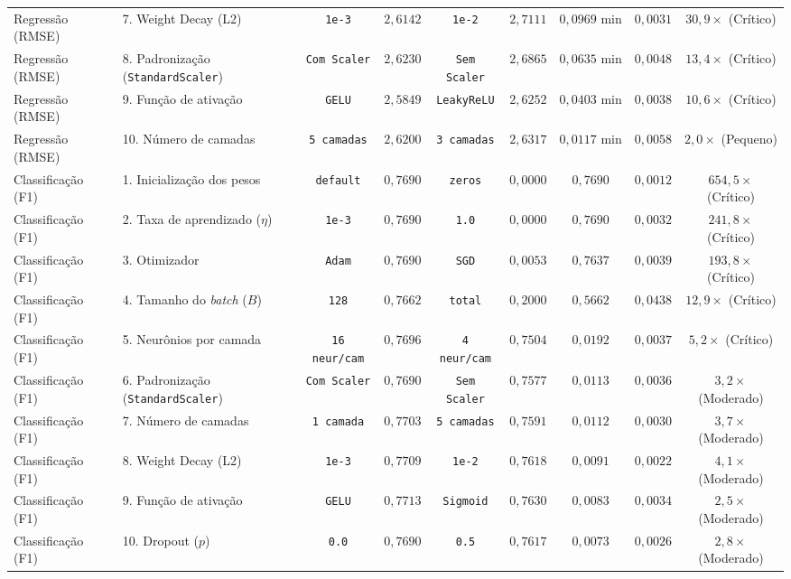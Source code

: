 \documentclass[12pt,a4paper]{article}
\begin{document}
\begin{table}[H]
{\begin{tabular}{llccccccc}
Regressão (RMSE) & 7. Weight Decay (L2) & \texttt{1e-3} & $2{,}6142$ & \texttt{1e-2} & $2{,}7111$ & $0{,}0969\text{ min}$ & $0{,}0031$ & $30{,}9\times$ (Crítico) \\
Regressão (RMSE) & 8. Padronização (\texttt{StandardScaler}) & \texttt{Com Scaler} & $2{,}6230$ & \texttt{Sem Scaler} & $2{,}6865$ & $0{,}0635\text{ min}$ & $0{,}0048$ & $13{,}4\times$ (Crítico) \\
Regressão (RMSE) & 9. Função de ativação & \texttt{GELU} & $2{,}5849$ & \texttt{LeakyReLU} & $2{,}6252$ & $0{,}0403\text{ min}$ & $0{,}0038$ & $10{,}6\times$ (Crítico) \\
Regressão (RMSE) & 10. Número de camadas & \texttt{5 camadas} & $2{,}6200$ & \texttt{3 camadas} & $2{,}6317$ & $0{,}0117\text{ min}$ & $0{,}0058$ & $2{,}0\times$ (Pequeno) \\
\midrule
Classificação (F1) & 1. Inicialização dos pesos & \texttt{default} & $0{,}7690$ & \texttt{zeros} & $0{,}0000$ & $0{,}7690$ & $0{,}0012$ & $654{,}5\times$ (Crítico) \\
Classificação (F1) & 2. Taxa de aprendizado ($\eta$) & \texttt{1e-3} & $0{,}7690$ & \texttt{1.0} & $0{,}0000$ & $0{,}7690$ & $0{,}0032$ & $241{,}8\times$ (Crítico) \\
Classificação (F1) & 3. Otimizador & \texttt{Adam} & $0{,}7690$ & \texttt{SGD} & $0{,}0053$ & $0{,}7637$ & $0{,}0039$ & $193{,}8\times$ (Crítico) \\
Classificação (F1) & 4. Tamanho do \textit{batch} ($B$) & \texttt{128} & $0{,}7662$ & \texttt{total} & $0{,}2000$ & $0{,}5662$ & $0{,}0438$ & $12{,}9\times$ (Crítico) \\
Classificação (F1) & 5. Neurônios por camada & \texttt{16 neur/cam} & $0{,}7696$ & \texttt{4 neur/cam} & $0{,}7504$ & $0{,}0192$ & $0{,}0037$ & $5{,}2\times$ (Crítico) \\
Classificação (F1) & 6. Padronização (\texttt{StandardScaler}) & \texttt{Com Scaler} & $0{,}7690$ & \texttt{Sem Scaler} & $0{,}7577$ & $0{,}0113$ & $0{,}0036$ & $3{,}2\times$ (Moderado) \\
Classificação (F1) & 7. Número de camadas & \texttt{1 camada} & $0{,}7703$ & \texttt{5 camadas} & $0{,}7591$ & $0{,}0112$ & $0{,}0030$ & $3{,}7\times$ (Moderado) \\
Classificação (F1) & 8. Weight Decay (L2) & \texttt{1e-3} & $0{,}7709$ & \texttt{1e-2} & $0{,}7618$ & $0{,}0091$ & $0{,}0022$ & $4{,}1\times$ (Moderado) \\
Classificação (F1) & 9. Função de ativação & \texttt{GELU} & $0{,}7713$ & \texttt{Sigmoid} & $0{,}7630$ & $0{,}0083$ & $0{,}0034$ & $2{,}5\times$ (Moderado) \\
Classificação (F1) & 10. Dropout ($p$) & \texttt{0.0} & $0{,}7690$ & \texttt{0.5} & $0{,}7617$ & $0{,}0073$ & $0{,}0026$ & $2{,}8\times$ (Moderado) \\
\bottomrule
\end{tabular}%
}
\end{table}
\end{document}
